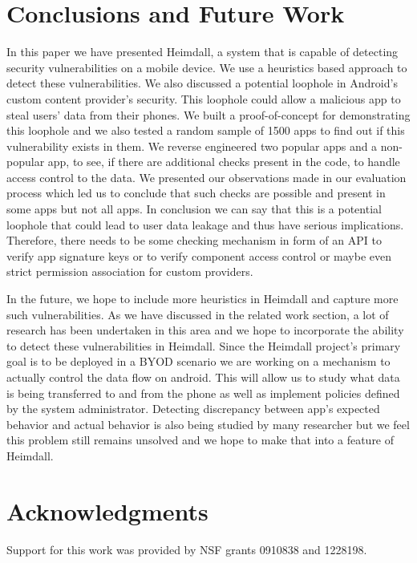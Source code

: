 \section{Conclusions and Future Work}
\label{concl}
In this paper we have presented Heimdall, a system that is capable of detecting security vulnerabilities on a mobile device. We use a heuristics based approach to detect these vulnerabilities. We also discussed a potential loophole in Android's custom content provider's security. This loophole could allow a malicious app to steal users' data from their phones. We built a proof-of-concept for demonstrating this loophole and we also tested a random sample of 1500 apps to find out if this vulnerability exists in them. We reverse engineered two popular apps and a non-popular app, to see, if there are additional checks present in the code, to handle access control to the data. We presented our observations made in our evaluation process which led us to conclude that such checks are possible and present in some apps but not all apps. In conclusion we can say that this is a potential loophole that could lead to user data leakage and thus have serious implications. Therefore, there needs to be some checking mechanism in form of an API to verify app signature keys or to verify component access control or maybe even strict permission association for custom providers.

In the future, we hope to include more heuristics in Heimdall and capture more such vulnerabilities. As we have discussed in the related work section, a lot of research has been undertaken in this area and we hope to incorporate the ability to detect these vulnerabilities in Heimdall. Since the Heimdall project's primary goal is to be deployed in a BYOD scenario we are working on a mechanism to actually control the data flow on android. This will allow us to study what data is being transferred to and from the phone as well as implement policies defined by the system administrator. Detecting discrepancy between app's expected behavior and actual behavior is also being studied by many researcher but we feel this problem still remains unsolved and we hope to make that into a feature of Heimdall. 

\section{Acknowledgments}
Support for this work was provided by NSF grants 0910838 and 1228198.


%
%

